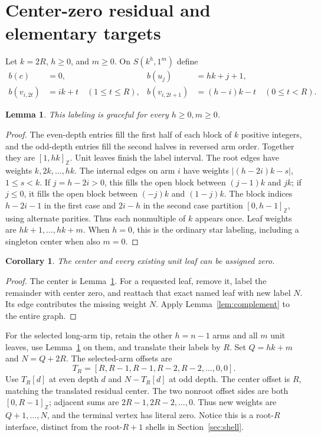 \documentclass[11pt,a4paper]{article}
\newtheorem{lemma}[theorem]{Lemma}
\newtheorem{corollary}[theorem]{Corollary}
\theoremstyle{definition}\newtheorem{definition}[theorem]{Definition}
\theoremstyle{remark}\newtheorem{remark}[theorem]{Remark}
\newcommand{\ints}[2]{[#1,#2]_{\mathbb Z}}
\begin{document}
\section{Center-zero residual and elementary targets}
\label{sec:centerzero}
Let $k=2R$, $h\ge0$, and $m\ge0$. On $S(k^h,1^m)$ define
\begin{align*}
 b(c)&=0,& b(u_j)&=hk+j+1,\\
 b(v_{i,2t})&=ik+t\quad(1\le t\le R),&
 b(v_{i,2t+1})&=(h-i)k-t\quad(0\le t<R).
\end{align*}
\begin{lemma}\label{lem:centerzero}
This labeling is graceful for every $h\ge0,m\ge0$.
\end{lemma}
\begin{proof}
The even-depth entries fill the first half of each block of $k$ positive
integers, and the odd-depth entries fill the second halves in reversed
arm order. Together they are $\ints1{hk}$. Unit leaves finish the label
interval. The root edges have weights $k,2k,\ldots,hk$.
The internal edges on arm $i$ have weights
$|(h-2i)k-s|$, $1\le s<k$. If $j=h-2i>0$, this fills the open
block between $(j-1)k$ and $jk$; if $j\le0$, it fills the open block
between $(-j)k$ and $(1-j)k$. The block indices
$h-2i-1$ in the first case and $2i-h$ in the second case partition
$\ints0{h-1}$, using alternate parities. Thus each nonmultiple of $k$
appears once. Leaf weights are $hk+1,\ldots,hk+m$.
When $h=0$, this is the ordinary star labeling, including a singleton
center when also $m=0$.
\end{proof}

\begin{corollary}\label{cor:leaves}
The center and every existing unit leaf can be assigned zero.
\end{corollary}
\begin{proof}
The center is Lemma~\ref{lem:centerzero}. For a requested leaf, remove it,
label the remainder with center zero, and reattach that exact named leaf
with new label $N$. Its edge contributes the missing weight $N$.
Apply Lemma~\ref{lem:complement} to the entire graph.
\end{proof}

For the selected long-arm tip, retain the other $h=n-1$ arms and all
$m$ unit leaves, use Lemma~\ref{lem:centerzero} on them, and translate
their labels by $R$. Set $Q=hk+m$ and $N=Q+2R$. The selected-arm offsets
are
\[
 T_R=[R,R-1,R-1,R-2,R-2,\ldots,0,0].
\]
Use $T_R[d]$ at even depth $d$ and $N-T_R[d]$ at odd depth.
The center offset is $R$, matching the translated residual center.
The two nonroot offset sides are both $\ints0{R-1}$;
adjacent sums are $2R-1,2R-2,\ldots,0$. Thus new weights are
$Q+1,\ldots,N$, and the terminal vertex has literal zero.
Notice this is a root-$R$ interface, distinct from the root-$R+1$
shells in Section~\ref{sec:shell}.
\end{document}
